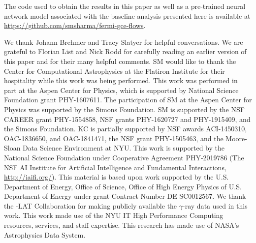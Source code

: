 \documentclass[prd,aps,10pt,nofootinbib,twocolumn,superscriptaddress,preprintnumbers,balancelastpage,longbibliography,floatfix]{revtex4-2}
\begin{document}
The code used to obtain the results in this paper as well as a pre-trained neural network model associated with the baseline analysis presented here is available at \url{https://github.com/smsharma/fermi-gce-flows}.

\vspace{.2cm}

\begin{acknowledgments}

We thank Johann Brehmer and Tracy Slatyer for helpful conversations. We are grateful to Florian List and Nick Rodd for carefully reading an earlier version of this paper and for their many helpful comments.
SM would like to thank the Center for Computational Astrophysics at the Flatiron Institute for their hospitality while this work was being performed. 
This work was performed in part at the Aspen Center for Physics, which is supported by National Science Foundation grant PHY-1607611.
The participation of SM at the Aspen Center for Physics was supported by the Simons Foundation.
SM is supported by the NSF CAREER grant PHY-1554858, NSF grants PHY-1620727 and PHY-1915409, and the Simons Foundation. 
KC is partially supported by NSF awards ACI-1450310, OAC-1836650, and OAC-1841471, the NSF grant PHY-1505463, and the Moore-Sloan Data Science Environment at NYU. 
This work is supported by the National Science Foundation under Cooperative Agreement PHY-2019786 (The NSF AI Institute for Artificial Intelligence and Fundamental Interactions, \url{http://iaifi.org/}).
This material is based upon work supported by the U.S. Department of Energy, Office of Science, Office of High Energy Physics of U.S. Department of Energy under grant Contract Number DE-SC0012567.
We thank the \Fermi-LAT Collaboration for making publicly available the $\gamma$-ray data used in this work.
This work made use of the NYU IT High Performance Computing resources, services, and staff expertise. 
This research has made use of NASA's Astrophysics Data System. 

\end{acknowledgments}
\end{document}
